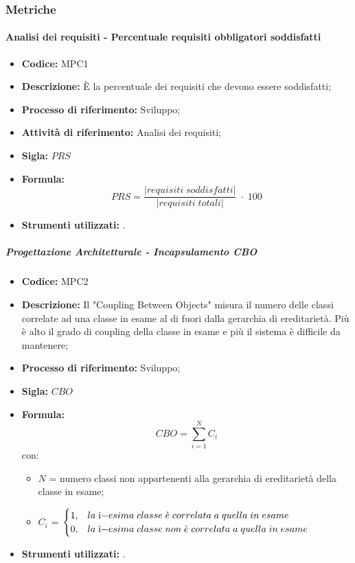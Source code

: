 \subsubsection{Metriche}
    \paragraph{Analisi dei requisiti - Percentuale requisiti obbligatori soddisfatti}
    \begin{itemize}
        \item \textbf{Codice:} MPC1
        \item \textbf{Descrizione:} È la percentuale dei requisiti che devono essere soddisfatti;
        \item \textbf{Processo di riferimento:} Sviluppo;
        \item \textbf{Attività di riferimento:} Analisi dei requisiti;
        \item \textbf{Sigla:} $PRS$
        \item \textbf{Formula:} $$PRS = {\frac{|requisiti \; soddisfatti|}{|requisiti \; totali|}}\; \cdot \; 100$$
        \item \textbf{Strumenti utilizzati:} .
    \end{itemize}
\subparagraph{Progettazione Architetturale - Incapsulamento CBO}
    \begin{itemize}
        \item \textbf{Codice:} MPC2
        \item \textbf{Descrizione:} Il "Coupling Between Objects" misura il numero delle classi correlate ad una classe in esame al di fuori dalla gerarchia di ereditarietà. Più è alto il grado di coupling della classe in esame e più il sistema è difficile da mantenere;
        \item \textbf{Processo di riferimento:} Sviluppo;
        \item \textbf{Sigla:} $CBO$
        \item \textbf{Formula:} $$CBO = {\sum_{i=1}^{N} C_i}$$
        con:
        \begin{itemize}
            \item $N$ = numero classi non appartenenti alla gerarchia di ereditarietà della classe in esame;
            \item $C_i$ =
            \begin{math} {
                \begin{cases}
                    1, & la \; $i$-esima \; classe \; \grave{e} \; correlata \; a \; quella \; in \; esame \\
                    0, & la \; $i$-esima \; classe \; non \; \grave{e} \; correlata \; a \; quella \; in \; esame
                \end{cases}
            }
            \end{math}
        \end{itemize}
        \item \textbf{Strumenti utilizzati:} .
    \end{itemize}
